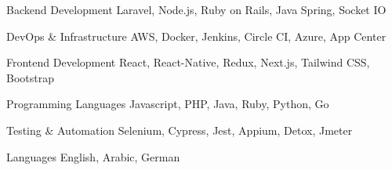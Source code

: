 

\begin{cvskills}


  \cvskill
    {Backend Development} %
    {Laravel, Node.js, Ruby on Rails, Java Spring, Socket IO} %

  \cvskill
    {DevOps \& Infrastructure} %
    {AWS, Docker, Jenkins, Circle CI, Azure, App Center} %

  \cvskill
    {Frontend Development} %
    {React, React-Native, Redux, Next.js, Tailwind CSS, Bootstrap} %

  \cvskill
    {Programming Languages} %
    {Javascript, PHP, Java, Ruby, Python, Go} %

  \cvskill
    {Testing \& Automation} %
    {Selenium, Cypress, Jest, Appium, Detox, Jmeter} %

  \cvskill
    {Languages} %
    {English, Arabic, German} %

\end{cvskills}
